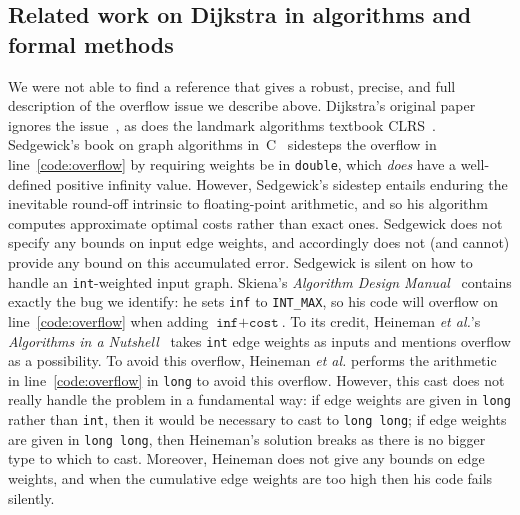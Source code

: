 \subsection{Related work on Dijkstra in algorithms and formal methods}
\label{sec:relworkdijkstra}
We were not able to find a reference that gives a robust, precise,
and full description of the overflow issue we describe above.
Dijkstra's original paper ignores the issue~\cite{DBLP:journals/nm/Dijkstra59}, as does the landmark algorithms textbook CLRS~\cite{clrs}. %
Sedgewick's book on graph algorithms in~C~\cite{sedgewick} sidesteps the overflow in line~\ref{code:overflow} by requiring weights be in \texttt{double}, which \emph{does} have a well-defined positive infinity value.  However, Sedgewick's sidestep entails enduring the inevitable round-off intrinsic to floating-point arithmetic, and so his algorithm computes approximate optimal costs rather than exact ones.  Sedgewick does not specify any bounds on input edge weights, and accordingly does not (and cannot) provide any bound on this accumulated error.  Sedgewick is silent on how to handle an \texttt{int}-weighted input graph.  Skiena's \emph{Algorithm Design Manual}~\cite{DBLP:books/daglib/0022194} contains exactly the bug we identify: he sets \texttt{inf} to \texttt{INT\_MAX}, so his code will overflow on
line~\ref{code:overflow} when adding $\texttt{inf} + \texttt{cost}$.
To its credit, Heineman \emph{et al.}'s \emph{Algorithms in a Nutshell}~\cite{heineman2008algorithms} takes \texttt{int} edge weights as inputs and mentions overflow as a possibility.  To avoid this overflow, Heineman \emph{et al.} performs the arithmetic in line~\ref{code:overflow} in \texttt{long} to avoid this overflow.  However, this cast does not really handle the problem in a fundamental way: if edge weights are given in \texttt{long} rather than \texttt{int}, then it would be necessary to cast to \texttt{long long}; if edge weights are given in \texttt{long long}, then Heineman's solution breaks as there is no bigger type to which to cast.  Moreover, Heineman does not give any bounds on edge weights, and when the cumulative edge weights are too high then his code fails silently. %


